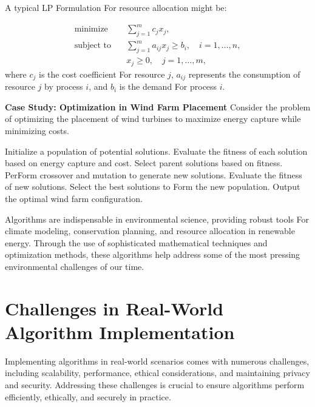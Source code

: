 \documentclass[12pt]{book} %
\begin{document}
A typical LP Formulation For resource allocation might be:

\begin{align}
    \text{minimize} \quad & \sum_{j=1}^{m} c_j x_j, \\
    \text{subject to} \quad & \sum_{j=1}^{m} a_{ij} x_j \geq b_i, \quad i = 1, \ldots, n, \\
    & x_j \geq 0, \quad j = 1, \ldots, m,
\end{align}
where $c_j$ is the cost coefficient For resource $j$, $a_{ij}$ represents the consumption of resource $j$ by process $i$, and $b_i$ is the demand For process $i$.

\textbf{Case Study: Optimization in Wind Farm Placement}
Consider the problem of optimizing the placement of wind turbines to maximize energy capture while minimizing costs.
\FloatBarrier
\begin{algorithm}
\caption{Genetic Algorithm For Wind Farm Placement}
\begin{algorithmic}[1]
\State Initialize a population of potential solutions.
\State Evaluate the fitness of each solution based on energy capture and cost.
    \State Select parent solutions based on fitness.
    \State PerForm crossover and mutation to generate new solutions.
    \State Evaluate the fitness of new solutions.
    \State Select the best solutions to Form the new population.
\EndFor
\State Output the optimal wind farm configuration.
\end{algorithmic}
\end{algorithm}
\FloatBarrier

Algorithms are indispensable in environmental science, providing robust tools For climate modeling, conservation planning, and resource allocation in renewable energy. Through the use of sophisticated mathematical techniques and optimization methods, these algorithms help address some of the most pressing environmental challenges of our time.


\section{Challenges in Real-World Algorithm Implementation}
Implementing algorithms in real-world scenarios comes with numerous challenges, including scalability, performance, ethical considerations, and maintaining privacy and security. Addressing these challenges is crucial to ensure algorithms perform efficiently, ethically, and securely in practice.
\end{document}
